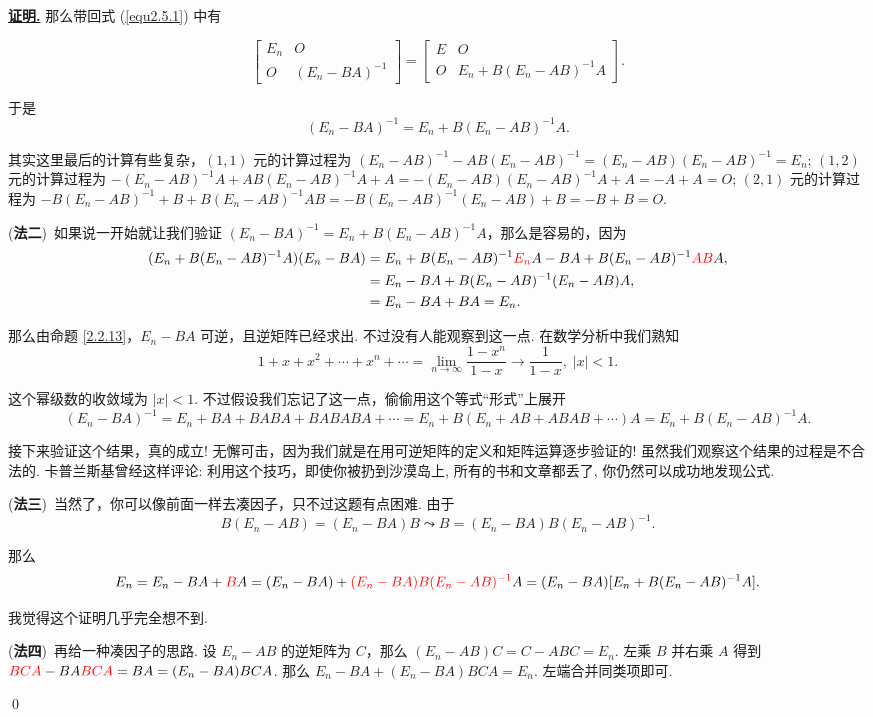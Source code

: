 \documentclass[10pt,openany]{article}
\theoremstyle{thmstyle} %
\theoremstyle{defstyle} %
\theoremstyle{prostyle} %
\theoremstyle{exastyle}
\theoremstyle{remstyle}
\renewenvironment{proof}[1][证明]{\par\underline{\textbf{#1.}} \;\fangsong}{\qed\par}
\begin{document}
\begin{proof}
那么带回式 (\ref{equ2.5.1}) 中有

\[ \begin{bmatrix}
	E_n & O \\
	O & (E_n-BA)^{-1}
\end{bmatrix}=\begin{bmatrix}
E & O \\
O & E_n+B(E_n-AB)^{-1}A
\end{bmatrix}. \]

于是
\[ (E_n-BA)^{-1}=E_n+B(E_n-AB)^{-1}A. \] 

其实这里最后的计算有些复杂，\((1,1) \) 元的计算过程为 \( (E_n-AB)^{-1}-AB(E_n-AB)^{-1}=(E_n-AB)(E_n-AB)^{-1}=E_n \); \( (1,2) \) 元的计算过程为 \(  -(E_n-AB)^{-1}A+AB(E_n-AB)^{-1}A+A=-(E_n-AB)(E_n-AB)^{-1}A+A=-A+A=O \); \( (2,1) \) 元的计算过程为 \( -B(E_n-AB)^{-1}+B+B(E_n-AB)^{-1}AB=-B(E_n-AB)^{-1}(E_n-AB)+B=-B+B=O \). 

\vspace{1ex}

(\textbf{法二})\ 如果说一开始就让我们验证 \( (E_n-BA)^{-1}=E_n+B(E_n-AB)^{-1}A \)，那么是容易的，因为
\begin{align*}
	(E_n+B(E_n-AB)^{-1}A)(E_n-BA) &= E_n+B(E_n-AB)^{-1}{\color{red}E_n}A-BA+B(E_n-AB)^{-1}{\color{red}AB}A, \\
	&=E_n-BA+B(E_n-AB)^{-1}(E_n-AB)A, \\
	&=E_n-BA+BA=E_n.
\end{align*}

那么由命题 \ref{2.2.13}，\( E_n-BA \) 可逆，且逆矩阵已经求出. 不过没有人能观察到这一点. 在数学分析中我们熟知
\[ 1+x+x^2+\cdots+x^n+\cdots= \lim\limits_{n \to \infty} \frac{1-x^n}{1-x} \to \frac{1}{1-x}, \; |x|<1. \]

这个幂级数的收敛域为 \( |x|<1 \). 不过假设我们忘记了这一点，偷偷用这个等式“形式”上展开
\[ (E_n-BA)^{-1}=E_n+BA+BABA+BABABA+\cdots=E_n+B(E_n+AB+ABAB+\cdots)A=E_n+B(E_n-AB)^{-1}A. \]

接下来验证这个结果，真的成立! 无懈可击，因为我们就是在用可逆矩阵的定义和矩阵运算逐步验证的! 虽然我们观察这个结果的过程是不合法的. 卡普兰斯基曾经这样评论: 利用这个技巧，即使你被扔到沙漠岛上, 所有的书和文章都丢了, 你仍然可以成功地发现公式.


\vspace{1ex}

(\textbf{法三})\ 当然了，你可以像前面一样去凑因子，只不过这题有点困难. 由于 
\[ B(E_n-AB)=(E_n-BA)B \leadsto B=(E_n-BA)B(E_n-AB)^{-1}. \]

那么
\[ E_n=E_n-BA+{\color{red}B}A=(E_n-BA)+{\color{red}(E_n-BA)B(E_n-AB)^{-1}}A=(E_n-BA)[E_n+B(E_n-AB)^{-1}A]. \]

我觉得这个证明几乎完全想不到.

\vspace{1ex}

(\textbf{法四})\ 再给一种凑因子的思路. 设 \( E_n-AB \) 的逆矩阵为 \( C \)，那么 \( (E_n-AB)C=C-ABC=E_n \). 左乘 \( B \) 并右乘 \( A \) 得到 \( {\color{red}BCA}-BA{\color{red} BCA}=BA=(E_n-BA)BCA \). 那么 \( E_n-BA+(E_n-BA)BCA=E_n \). 左端合并同类项即可. 

\end{proof}
\end{document}
